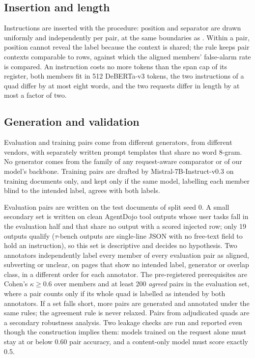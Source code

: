 \subsection{Insertion and length}
Instructions are inserted with the \vthree{} procedure: position and separator are drawn uniformly and independently
per pair, at the same boundaries as \vthree{}. Within a pair, position cannot reveal the label because the context is
shared; the rule keeps pair contexts comparable to \vthree{} rows, against which the aligned members' false-alarm
rate is compared. An instruction costs no more tokens than the \vthree{} span cap of its register, both members fit
in 512 DeBERTa-v3 tokens, the two instructions of a quad differ by at most eight words, and the two requests differ in
length by at most a factor of two.

\subsection{Generation and validation}
Evaluation and training pairs come from different generators, from different vendors, with separately written prompt
templates that share no word 8-gram. No generator comes from the family of any request-aware comparator or of our
model's backbone. Training pairs are drafted by Mistral-7B-Instruct-v0.3 on \vthree{} training documents only, and
kept only if the same model, labelling each member blind to the intended label, agrees with both labels.

Evaluation pairs are written on the test documents of \vthree{} split seed 0. A small secondary set is written on
clean AgentDojo tool outputs whose user tasks fall in the evaluation half and that share no output with a scored
injected row; only 19 outputs qualify ($\tau$-bench outputs are single-line JSON with no free-text field to hold an
instruction), so this set is descriptive and decides no hypothesis. Two annotators independently label every member of every evaluation pair as
aligned, subverting or unclear, on pages that show no intended label, generator or overlap class, in a different
order for each annotator. The pre-registered prerequisites are Cohen's $\kappa \geq 0.6$ over members and at least
200 \emph{agreed} pairs in the \vthree{} evaluation set, where a pair counts only if its whole quad is labelled as intended by both
annotators. If a set falls short, more pairs are generated and annotated under the same rules; the agreement rule is
never relaxed. Pairs from adjudicated quads are a secondary robustness analysis. Two leakage checks are run and
reported even though the construction implies them: models trained on the request alone must stay at or below 0.60
pair accuracy, and a content-only model must score exactly 0.5. 

